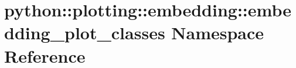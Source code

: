 \hypertarget{namespacepython_1_1plotting_1_1embedding_1_1embedding__plot__classes}{
\section{python::plotting::embedding::embedding\_\-plot\_\-classes Namespace Reference}
\label{namespacepython_1_1plotting_1_1embedding_1_1embedding__plot__classes}
}
